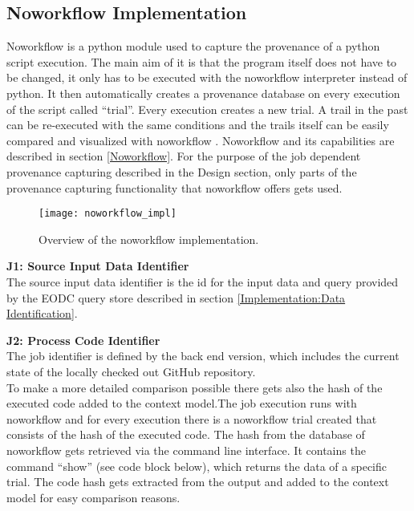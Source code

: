 \documentclass[draft,final]{vutinfth} %
\begin{document}
\subsection{Noworkflow Implementation}\label{Implementation:Noworkflow Implementation}
Noworkflow is a python module used to capture the provenance of a python script execution. The main aim of it is that the program itself does not have to be changed, it only has to be executed with the noworkflow interpreter instead of python. It then automatically creates a provenance database on every execution of the script called “trial”. Every execution creates a new trial. A trail in the past can be re-executed with the same conditions and the trails itself can be easily compared and visualized with noworkflow \cite{c9e0604becba42af96a9cb0a6f60018b}. Noworkflow and its capabilities are described in section \ref{Noworkflow}. 
For the purpose of the job dependent provenance capturing described in the Design section, only parts of the provenance capturing functionality that noworkflow offers gets used.    

\begin{figure}[h]
	\centering
	\texttt{[image: noworkflow\_impl]}
	\caption{Overview of the noworkflow implementation.}
	\label{fig:noworkflow_impl} %
\end{figure}

\textbf{J1:  Source Input Data Identifier} \\
The source input data identifier is the id for the input data and query provided by the EODC query store described in section \ref{Implementation:Data Identification}. 


\textbf{J2: Process Code Identifier} \\
The job identifier is defined by the back end version, which includes the current state of the locally checked out GitHub repository.\\
To make a more detailed comparison possible there gets also the hash of the executed code added to the context model.The job execution runs with noworkflow and for every execution there is a noworkflow trial created that consists of the hash of the executed code. The hash from the database of noworkflow gets retrieved via the command line interface. It contains the command “show” (see code block below), which returns the data of a specific trial. The code hash gets extracted from the output and added to the context model for easy comparison reasons. 
\end{document}
